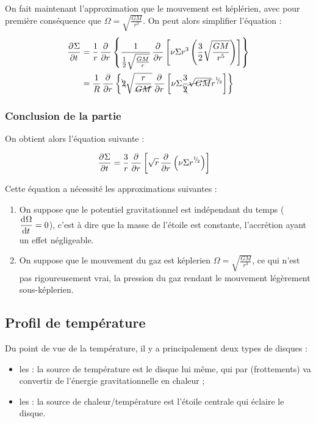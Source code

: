 On fait maintenant l'approximation que le mouvement est képlérien, avec pour première conséquence que $\Omega = \sqrt{\frac{GM}{r^3}}$. On peut alors simplifier l'équation : 
\begin{align*}
\dpd{\Sigma}{t} &= \inv{r}\dpd{}{r}\left\{\inv{\inv{2}\sqrt{\frac{GM}{r}}} \dpd{}{r}\left[\nu \Sigma r^3 \left(\frac{3}{2}\sqrt{\frac{GM}{r^5}}\right)\right]\right\}\nonumber\\
&= \inv{R}\dpd{}{r}\left\{\bcancel{2}\sqrt{\frac{r}{\cancel{GM}}} \dpd{}{r}\left[\nu \Sigma \frac{3}{\bcancel{2}}\cancel{\sqrt{GM}}r^\sfrac{1}{2}\right]\right\}\nonumber\\
\end{align*}

\subsubsection{Conclusion de la partie}
On obtient alors l'équation suivante : 
\begin{important}
\begin{align}
\mathinner{ \dfrac{\partial{^{}}\Sigma}{\partial{{t}^{}}} } &=\frac{3}{r}\mathinner{ \dfrac{\partial{^{}}}{\partial{{r}^{}}} }\left[\sqrt{r} \mathinner{ \dfrac{\partial{^{}}}{\partial{{r}^{}}} }\left(\nu \Sigma r^{{}^{1\!\!}/ _{\!2}}\right)\right]
\end{align}
\end{important}

Cette équation a nécessité les approximations suivantes : 
\begin{enumerate}
\item On suppose que le potentiel gravitationnel est indépendant du temps ($\mathinner{ \dfrac{\operatorname{d \!}{^{}}\Omega}{\operatorname{d \!}{{t}^{}}} }=0$), c'est à dire que la masse de l'étoile est constante, l'accrétion ayant un effet négligeable.
\item On suppose que le mouvement du gaz est képlerien $\Omega=\sqrt{\frac{GM}{r^3}}$, ce qui n'est pas rigoureusement vrai, la pression du gaz rendant le mouvement légèrement sous-képlerien.
\end{enumerate}

\subsection{Profil de température}
Du point de vue de la température, il y a principalement deux types de disques : 
\begin{itemize}
\item les  : la source de température est le disque lui même, qui par  (frottements) va convertir de l'énergie gravitationnelle en chaleur ;
\item les  : la source de chaleur/température est l'étoile centrale qui éclaire le disque. 
\end{itemize}

